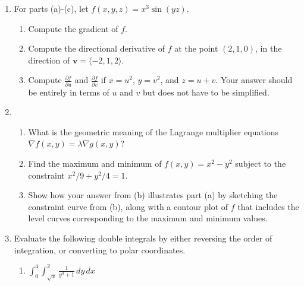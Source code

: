 \documentclass[12pt]{article}
\newcommand{\points}[1]{\marginpar{\hspace{24pt}[#1]}}
\newcommand{\di}{\displaystyle}
\newcommand{\pd}[2]{\frac{\partial #1}{\partial #2}}
\begin{document}
\begin{enumerate}
\item For parts (a)-(c), let $f(x,y,z) = x^3\sin (yz)$.
\begin{enumerate}
\item Compute the gradient of $f$. \points{3}

\vspace{2in}

\item Compute the directional derivative of $f$ at the point $(2,1,0)$, in the direction of $\mathbf{v} = \langle -2,1,2\rangle$.\points{3}

\vspace{2in}

\item Compute $\di \pd{f}{u}$ and $\di \pd{f}{v}$ if $x = u^2$, $y=v^2$, and $z=u+v$.\points{6}
Your answer should be entirely in terms of $u$ and $v$ but does not have to be simplified.
\end{enumerate}
\newpage

\item \begin{enumerate}
\item What is the geometric meaning of the Lagrange multiplier equations\\ $\nabla f(x,y) = \lambda \nabla g(x,y)$?\points{3}

\vspace{1.5in}

\item Find the maximum and minimum of $f(x,y)=x^2-y^2$ subject to the constraint $x^2/9+y^2/4=1$. \points{7}

\vspace{3in}

\item Show how your answer from (b) illustrates part (a) by sketching the constraint curve from (b), along with a contour plot of $f$ that includes the level curves corresponding to the maximum and minimum values. \points{4}
\end{enumerate}
\newpage

\item Evaluate the following double integrals by either reversing the order of integration, or converting to polar coordinates.
\begin{enumerate}
\item $\di \int_0^4\int_{\sqrt{x}}^2\frac{1}{y^3+1}\,dy\,dx$ \points{6}

\vspace*{3.75in}


\end{enumerate}
\end{enumerate}
\end{document}
